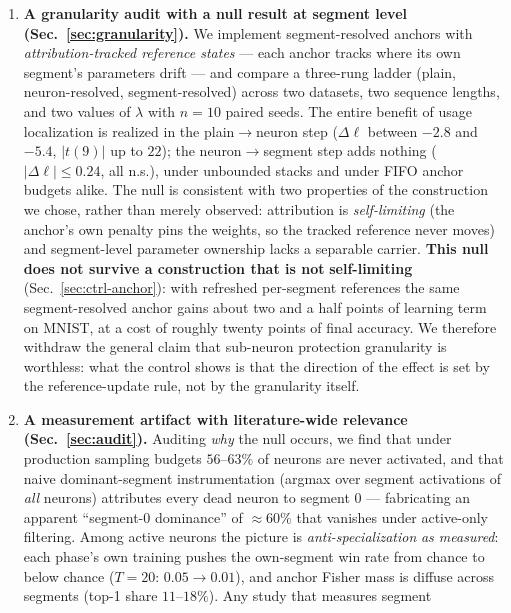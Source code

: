 \documentclass[10pt]{article}
\begin{document}
\begin{enumerate}
\item \textbf{A granularity audit with a null result at segment level
      (Sec.~\ref{sec:granularity}).} We implement segment-resolved anchors
      with \emph{attribution-tracked reference states} --- each anchor tracks
      where its own segment's parameters drift --- and compare a three-rung
      ladder (plain, neuron-resolved, segment-resolved) across two datasets,
      two sequence lengths, and two values of $\lambda$ with $n{=}10$ paired seeds. The
      entire benefit of usage localization is realized in the
      plain$\to$neuron step ($\Delta\ell$ between $-2.8$ and $-5.4$,
      $|t(9)|$ up to $22$); the neuron$\to$segment step adds nothing
      ($|\Delta\ell|\le 0.24$, all n.s.), under unbounded stacks and under
      FIFO anchor budgets alike. The null is consistent with two properties of the
      construction we chose, rather than merely observed: attribution is
      \emph{self-limiting} (the anchor's own
      penalty pins the weights, so the tracked reference never moves) and
      segment-level parameter ownership lacks a separable carrier.
      \textbf{This null does not survive a construction that is not}
      \textbf{self-limiting} (Sec.~\ref{sec:ctrl-anchor}): with refreshed
      per-segment references the same segment-resolved anchor gains
      about two and a half points of learning term on MNIST, at a cost of roughly
      twenty points of final accuracy. We therefore withdraw the general
      claim that sub-neuron protection granularity is worthless: what the
      control shows is that the direction of the effect is set by the
      reference-update rule, not by the granularity itself.
\item \textbf{A measurement artifact with literature-wide relevance
      (Sec.~\ref{sec:audit}).} Auditing \emph{why} the null occurs, we find
      that under production sampling budgets $56$--$63\%$ of neurons are
      never activated, and that naive dominant-segment instrumentation
      (argmax over segment activations of \emph{all} neurons) attributes
      every dead neuron to segment 0 --- fabricating an apparent
      ``segment-0 dominance'' of $\approx 60\%$ that vanishes under
      active-only filtering. Among active neurons the picture is
      \emph{anti-specialization} \emph{as measured}: each phase's own training pushes the
      own-segment win rate from chance to below chance
      ($T{=}20$: $0.05 \to 0.01$), and anchor Fisher mass is diffuse across
      segments (top-1 share $11$--$18\%$). Any study that measures segment

\end{enumerate}
\end{document}
